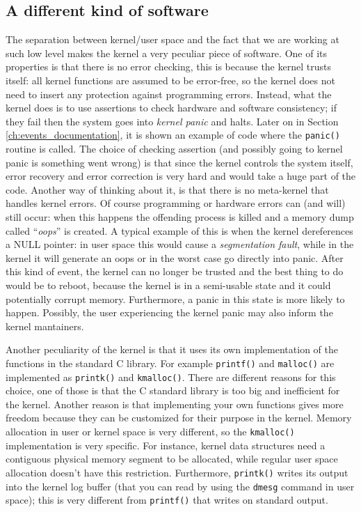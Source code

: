 \subsection{A different kind of software}
The separation between kernel/user space and the fact that we are working at such low level makes the kernel a very peculiar piece of software. One of its properties is that there is no error checking, this is because the kernel trusts itself: all kernel functions are assumed to be error-free, so the kernel does not need to insert any protection against programming errors\cite{cesati}. Instead, what the kernel does is to use assertions to check hardware and software consistency; if they fail then the system goes into \textit{kernel panic} and halts. Later on in Section \ref{ch:events_documentation}, it is shown an example of code where the \verb|panic()| routine is called. The choice of checking assertion (and possibly going to kernel panic is something went wrong) is that since the kernel controls the system itself, error recovery and error correction is very hard and would take a huge part of the code. Another way of thinking about it, is that there is no meta-kernel that handles kernel errors. Of course programming or hardware errors can (and will) still occur: when this happens the offending process is killed and a memory dump called ``\textit{oops}'' is created. A typical example of this is when the kernel dereferences a NULL pointer: in user space this would cause a \textit{segmentation fault}, while in the kernel it will generate an oops or in the worst case go directly into panic. After this kind of event, the kernel can no longer be trusted and the best thing to do would be to reboot, because the kernel is in a semi-usable state and it could potentially corrupt memory. Furthermore, a panic in this state is more likely to happen. %
Possibly, the user experiencing the kernel panic may also inform the kernel mantainers.

Another peculiarity of the kernel is that it uses its own implementation of the functions in the standard C library. For example \verb|printf()| and \verb|malloc()| are implemented as \verb|printk()| and \verb|kmalloc()|. There are different reasons for this choice, one of those is that the C standard library is too big and inefficient for the kernel. Another reason is that implementing your own functions gives more freedom because they can be customized for their purpose in the kernel. Memory allocation in user or kernel space is very different, so the \verb|kmalloc()| implementation is very specific. For instance, kernel data structures need a contiguous physical memory segment to be allocated, while regular user space allocation doesn't have this restriction. Furthermore, \verb|printk()| writes its output into the kernel log buffer (that you can read by using the \verb|dmesg| command in user space); this is very different from \verb|printf()| that writes on standard output.

